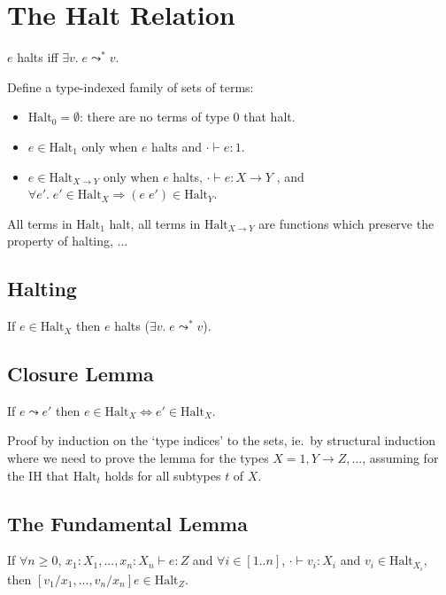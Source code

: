 \documentclass[a4paper,11pt]{article}
\begin{document}
\section{The Halt Relation}
{

    \(e\) halts iff \(\exists v.\; e \leadsto^* v\).

    Define a type-indexed family of sets of terms: 
    \begin{itemize}
    \item \(\text{Halt}_0 = \emptyset\): there are no terms of type \(0\) that halt.
    \item \(e \in \text{Halt}_1\) only when \(e\) halts and \(\cdot \vdash e : 1\).
    \item \(e \in \text{Halt}_{X \rightarrow Y}\) only when \(e\) halts, \(\cdot \vdash e : X \rightarrow Y\) , and
    \(\forall e'.\; e' \in \text{Halt}_X \Longrightarrow (e\;e') \in \text{Halt}_Y\).
    \end{itemize}

    All terms in \(\text{Halt}_1\) halt, all terms in \(\text{Halt}_{X \rightarrow Y}\) are functions which preserve the
    property of halting, ...

    \subsection*{Halting}
    {
        If \(e\in\text{Halt}_X\) then \(e\) halts (\(\exists v.\;e \leadsto^* v\)).

    }
    \subsection*{Closure Lemma}
    {
        If \(e \leadsto e'\) then \(e \in \text{Halt}_X \Longleftrightarrow e' \in \text{Halt}_X\).
        
        Proof by induction on the `type indices' to the sets, ie.\ by structural induction where we need to prove the
        lemma for the types \(X = 1, Y \rightarrow Z, ...\), assuming for the IH that \(\text{Halt}_t\) holds for all
        subtypes \(t\) of \(X\).

    }
    \subsection*{The Fundamental Lemma}
    {
        
        If \(\forall n \geq 0\), \(x_1:X_1,...,x_n:X_n \vdash e : Z\) and \(\forall i\in[1..n]\), \(\cdot\vdash
        v_i:X_i\) and \(v_i \in \text{Halt}_{X_i}\), then \([v_1/x_1,...,v_n/x_n]e \in \text{Halt}_Z\).

}}
\end{document}
